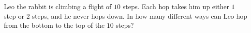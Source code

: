 Leo the rabbit is climbing a flight of $10$ steps. Each hop takes him up either $1$ step or $2$ steps, and he never hops down. In how many different ways can Leo hop from the bottom to the top of the $10$ steps?
